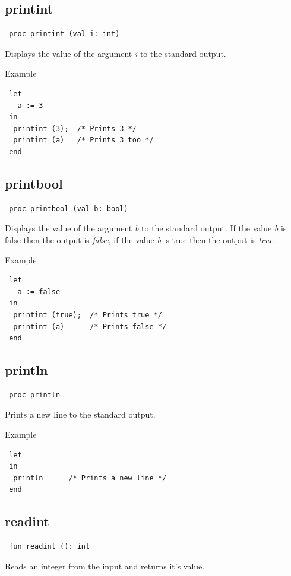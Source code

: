 \documentclass[a4paper, 11pt]{report}
\newcommand{\subarg}[1]{\textsl{#1}}
\newcommand{\valconst}[1]{\textsl{#1}}
\begin{document}
\subsection{printint}

\begin{verbatim}
 proc printint (val i: int)
\end{verbatim}
Displays the value of the argument \subarg{i} to the standard output.

Example
\begin{verbatim}
 let
   a := 3
 in
  printint (3);  /* Prints 3 */
  printint (a)   /* Prints 3 too */
 end
\end{verbatim}


\subsection{printbool}

\begin{verbatim}
 proc printbool (val b: bool)
\end{verbatim}
Displays the value of the argument \subarg{b} to the standard output.
If the value \subarg{b} is false then the output is \valconst{false},
if the value \subarg{b} is true then the output is \valconst{true}.

Example
\begin{verbatim}
 let
   a := false
 in
  printint (true);  /* Prints true */
  printint (a)      /* Prints false */
 end
\end{verbatim}


\subsection{println}

\begin{verbatim}
 proc println
\end{verbatim}
Prints a new line to the standard output.

Example
\begin{verbatim}
 let
 in
  println      /* Prints a new line */
 end
\end{verbatim}


\subsection{readint}

\begin{verbatim}
 fun readint (): int
\end{verbatim}
Reads an integer from the input and returns it's value.
\end{document}

